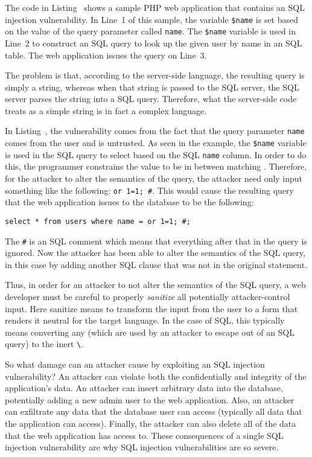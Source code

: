 

The code in Listing~ shows a sample PHP web
application that contains an SQL injection vulnerability. In Line~1 of
this sample, the variable \texttt{\$name} is set based on the value of
the query parameter called \texttt{name}. The \texttt{\$name} variable
is used in Line~2 to construct an SQL query to look up the given user
by name in an SQL table. The web application issues the query on Line~3.

The problem is that, according to the server-side language, the
resulting query is simply a string, whereas when that string is passed
to the SQL server, the SQL server parses the string into a SQL query.
Therefore, what the server-side code treats as a simple string is in
fact a complex language. 

In Listing~, the vulnerability comes from the
fact that the query parameter \texttt{name} comes from the user and is
untrusted. As seen in the example, the \texttt{\$name} variable is
used in the SQL query to select based on the SQL \texttt{name} column.
In order to do this, the programmer constrains the value to be
in between matching \texttt{\textquotesingle}. Therefore, for the
attacker to alter the semantics of the query, the attacker need only
input something like the following: \texttt{\textquotesingle or 1=1;
  \#}. This would cause the resulting query that the web application
issues to the database to be the following:

\texttt{select * from users where name =
  \textquotesingle\textquotesingle or 1=1; \#\textquotesingle;}

The \texttt{\#} is an SQL comment which means that everything after
that in the query is ignored. Now the attacker has been able to alter
the semantics of the SQL query, in this case by adding another SQL
clause that was not in the original statement. 

Thus, in order for an attacker to not alter the semantics of the SQL
query, a web developer must be careful to properly \emph{sanitize} all
potentially attacker-control input. Here sanitize means to transform
the input from the user to a form that renders it neutral for the
target language. In the case of SQL, this typically means converting
any \texttt{\textquotesingle} (which are used by an attacker to escape
out of an SQL query) to the inert
\texttt{\textbackslash\textquotesingle}.

So what damage can an attacker cause by exploiting an SQL injection
vulnerability? An attacker can violate both the confidentially and
integrity of the application's data. An attacker can insert arbitrary
data into the database, potentially adding a new admin user to the web
application. Also, an attacker can exfiltrate any data that the
database user can access (typically all data that the application can
access). Finally, the attacker can also delete all of the data that
the web application has access to. These consequences of a single SQL
injection vulnerability are why SQL injection vulnerabilities are so
severe.


